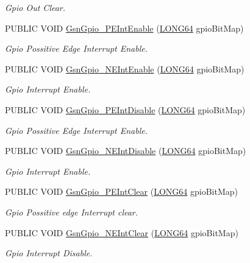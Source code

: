\begin{DoxyCompactItemize}
\begin{DoxyCompactList}\small\item\em Gpio Out Clear. \end{DoxyCompactList}\item 
PUBLIC VOID \hyperlink{a00648_gaba2b3db43960f2d257bcc9da83e51db4}{GsnGpio\_\-PEIntEnable} (\hyperlink{a00660_gae57305825c7d329ad8a3065ae045e875}{LONG64} gpioBitMap)
\begin{DoxyCompactList}\small\item\em Gpio Possitive Edge Interrupt Enable. \end{DoxyCompactList}\item 
PUBLIC VOID \hyperlink{a00648_ga9f8bfa1b71f64bd2dcf06ff51e085d26}{GsnGpio\_\-NEIntEnable} (\hyperlink{a00660_gae57305825c7d329ad8a3065ae045e875}{LONG64} gpioBitMap)
\begin{DoxyCompactList}\small\item\em Gpio Interrupt Enable. \end{DoxyCompactList}\item 
PUBLIC VOID \hyperlink{a00648_ga61b46966afa3dafd5fd49035a991aef9}{GsnGpio\_\-PEIntDisable} (\hyperlink{a00660_gae57305825c7d329ad8a3065ae045e875}{LONG64} gpioBitMap)
\begin{DoxyCompactList}\small\item\em Gpio Possitive Edge Interrupt Enable. \end{DoxyCompactList}\item 
PUBLIC VOID \hyperlink{a00648_ga170e15d6ae8011c0a008e6309715a23a}{GsnGpio\_\-NEIntDisable} (\hyperlink{a00660_gae57305825c7d329ad8a3065ae045e875}{LONG64} gpioBitMap)
\begin{DoxyCompactList}\small\item\em Gpio Interrupt Enable. \end{DoxyCompactList}\item 
PUBLIC VOID \hyperlink{a00648_ga4408d667f2fcbc51c669e8a8b25e2f6c}{GsnGpio\_\-PEIntClear} (\hyperlink{a00660_gae57305825c7d329ad8a3065ae045e875}{LONG64} gpioBitMap)
\begin{DoxyCompactList}\small\item\em Gpio Possitive edge Interrupt clear. \end{DoxyCompactList}\item 
PUBLIC VOID \hyperlink{a00648_ga4b1dc7062930fe980b86818e438c1cb0}{GsnGpio\_\-NEIntClear} (\hyperlink{a00660_gae57305825c7d329ad8a3065ae045e875}{LONG64} gpioBitMap)
\begin{DoxyCompactList}\small\item\em Gpio Interrupt Disable. \end{DoxyCompactList}\end{DoxyCompactItemize}


